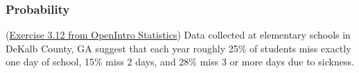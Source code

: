 \documentclass[12pt,answers]{exam}
\newcounter{countA}
\begin{document}
\subsubsection*{Probability}\label{probability}
\begin{questions}
\setcounter{question}{\value{countA}}
%
%
\question
  (\href{http://people.hsc.edu/faculty-staff/blins/books/OpenIntroStats4e.pdf\#eoce.3.12}{Exercise 3.12 from OpenIntro Statistics}) Data collected at elementary schools in DeKalb County, GA suggest that
  each year roughly 25\% of students miss exactly one day of school,
  15\% miss 2 days, and 28\% miss 3 or more days due to sickness.


\end{questions}
\end{document}
